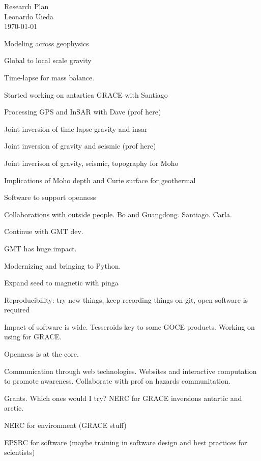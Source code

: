 \documentclass[12pt,notitlepage]{article}
\begin{document}
\begin{center}
    {\huge Research Plan}
    \\[0.2in]
    {Leonardo Uieda}
    \\[0.1in]
    {\small \today}
\end{center}



Modeling across geophysics

Global to local scale gravity

Time-lapse for mass balance.

Started working on antartica GRACE with Santiago

Processing GPS and InSAR with Dave (prof here)

Joint inversion of time lapse gravity and insar

Joint inversion of gravity and seismic (prof here)

Joint inverison of gravity, seismic, topography for Moho

Implications of Moho depth and Curie surface for geothermal

Software to support openness

Collaborations with outside people. Bo and Guangdong. Santiago. Carla.

Continue with GMT dev.

GMT has huge impact.

Modernizing and bringing to Python.

Expand seed to magnetic with pinga

Reproducibility: try new things, keep recording things on git, open software is required

Impact of software is wide. Tesseroids key to some GOCE products. Working on using for
GRACE.

Openness is at the core.

Communication through web technologies. Websites and interactive computation to promote
awareness. Collaborate with prof on hazards communitation.

Grants. Which ones would I try? NERC for GRACE inversions antartic and arctic.

NERC for environment (GRACE stuff)

EPSRC for software (maybe training in software design and best practices for scientists)






\end{document}
